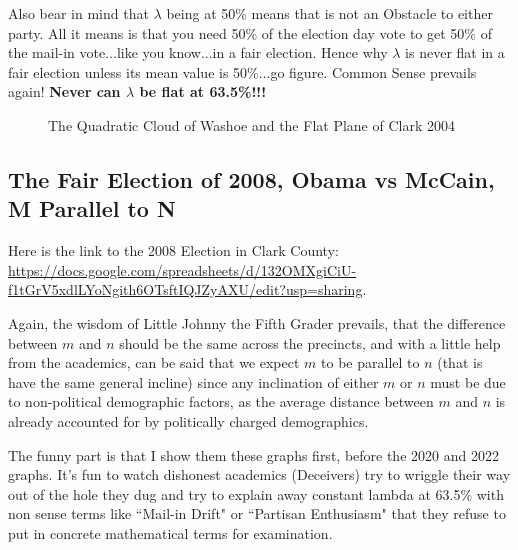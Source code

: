 \documentclass[preprint,13pt]{elsarticle}
\begin{document}
Also bear in mind that $\lambda$ being at 50\% means that is not an Obstacle to either party. All it means is that you need 50\% of the election day vote to get 50\% of the mail-in vote...like you know...in a fair election. Hence why $\lambda$ is never flat in a fair election unless its mean value is 50\%...go figure. Common Sense prevails again! \textbf{Never can $\lambda$ be flat at 63.5\%!!!}
\begin{figure}[bp!]
\begin{center}
\caption{The Quadratic Cloud of Washoe and the Flat Plane of Clark 2004}
\noindent{}
\end{center}
\end{figure}
\newpage
\subsection{The Fair Election of 2008, Obama vs McCain, M Parallel to N}

Here is the link to the 2008 Election in Clark County: \url{https://docs.google.com/spreadsheets/d/132OMXgiCiU-f1tGrV5xdlLYoNgith6OTsftIQJZyAXU/edit?usp=sharing}.

Again, the wisdom of Little Johnny the Fifth Grader prevails, that the difference between $m$ and $n$ should be the same across the precincts, and with a little help from the academics, can be said that we expect $m$ to be parallel to $n$ (that is have the same general incline) since any inclination of either $m$ or $n$ must be due to non-political demographic factors, as the average distance between $m$ and $n$ is already accounted for by politically charged demographics.

The funny part is that I show them these graphs first, before the 2020 and 2022 graphs. It's fun to watch dishonest academics (Deceivers) try to wriggle their way out of the hole they dug and try to explain away constant lambda at 63.5\% with non sense terms like ``Mail-in Drift" or ``Partisan Enthusiasm" that they refuse to put in concrete mathematical terms for examination.
\end{document}
